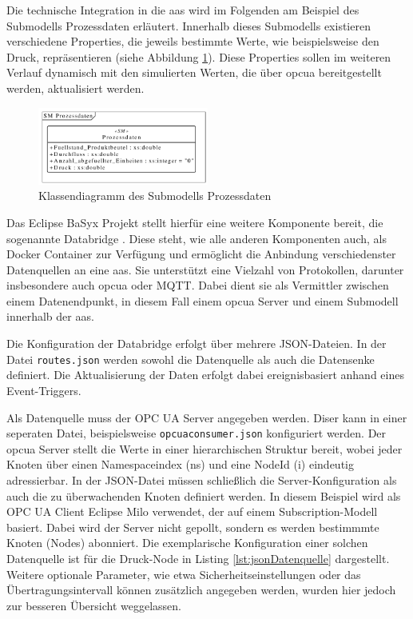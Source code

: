 Die technische Integration in die \acs{aas} wird im Folgenden am Beispiel des Submodells Prozessdaten erläutert.
Innerhalb dieses Submodells existieren verschiedene Properties, die jeweils bestimmte Werte, wie beispielsweise den Druck, repräsentieren (siehe Abbildung \ref{fig:UMLSubmodellProcessData}). 
Diese Properties sollen im weiteren Verlauf dynamisch mit den simulierten Werten, die über \acs{opcua} bereitgestellt werden, aktualisiert werden.

\begin{figure}[htbp]
    \centering
    \includegraphics[width=0.5\textwidth]{Bilder/UML/submodel_processdata.pdf}
    \caption{Klassendiagramm des Submodells Prozessdaten}
    \label{fig:UMLSubmodellProcessData}
\end{figure}

Das Eclipse BaSyx Projekt stellt hierfür eine weitere Komponente bereit, die sogenannte Databridge \cite{BaSyxDatabridge}.
Diese steht, wie alle anderen Komponenten auch, als Docker Container zur Verfügung und ermöglicht die Anbindung verschiedenster Datenquellen an eine \acs{aas}.
Sie unterstützt eine Vielzahl von Protokollen, darunter insbesondere auch \acs{opcua} oder MQTT.
Dabei dient sie als Vermittler zwischen einem Datenendpunkt, in diesem Fall einem \acs{opcua} Server und einem Submodell innerhalb der \acs{aas}.

Die Konfiguration der Databridge erfolgt über mehrere JSON-Dateien.
In der Datei \texttt{routes.json} werden sowohl die Datenquelle als auch die Datensenke definiert.
Die Aktualisierung der Daten erfolgt dabei ereignisbasiert anhand eines Event-Triggers.

Als Datenquelle muss der OPC UA Server angegeben werden.
Diser kann in einer seperaten Datei, beispielsweise \texttt{opcuaconsumer.json} konfiguriert werden.
Der \acs{opcua} Server stellt die Werte in einer hierarchischen Struktur bereit, wobei jeder Knoten über einen Namespaceindex (ns) und eine NodeId (i) eindeutig adressierbar.
In der JSON-Datei müssen schließlich die Server-Konfiguration als auch die zu überwachenden Knoten definiert werden.
In diesem Beispiel wird als OPC UA Client Eclipse Milo verwendet, der auf einem Subscription-Modell basiert.
Dabei wird der Server nicht gepollt, sondern es werden bestimmmte Knoten (Nodes) abonniert.
Die exemplarische Konfiguration einer solchen Datenquelle ist für die Druck-Node in Listing \ref{lst:jsonDatenquelle} dargestellt.
Weitere optionale Parameter, wie etwa Sicherheitseinstellungen oder das Übertragungsintervall können zusätzlich angegeben werden, wurden hier jedoch zur besseren Übersicht weggelassen.

